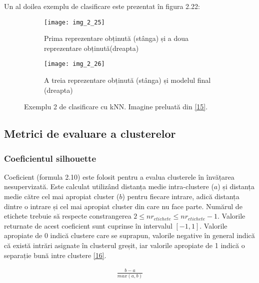 Un al doilea exemplu de clasificare este prezentat în figura 2.22:
\begin{figure}[!tbp]
  \begin{subfigure}[b]{0.4\textwidth}
    \texttt{[image: img\_2\_25]}
    \caption{Prima reprezentare obținută (stânga) și a doua reprezentare obținută(dreapta)}
    \label{fig:f1}
  \end{subfigure}
  \hfill
  \begin{subfigure}[b]{0.4\textwidth}
    \texttt{[image: img\_2\_26]}
    \caption{A treia reprezentare obținută (stânga) și modelul final (dreapta)}
    \label{fig:f2}
  \end{subfigure}
  \caption[Exemplu 2 de clasificare cu kNN]{Exemplu 2 de clasificare cu kNN. Imagine preluată din \hyperlink{gongdeguo}{[15]}.}
\end{figure}

\subsection{Metrici de evaluare a clusterelor}

\subsubsection{Coeficientul silhouette}
Coeficient (formula 2.10) este folosit pentru a evalua clusterele în învățarea nesupervizată. Este calculat utilizând distanța medie intra-clustere ($a$) și distanța medie către cel mai apropiat cluster ($b$) pentru fiecare intrare, adică distanța dintre o intrare și cel mai apropiat cluster din care nu face parte. Numărul de etichete trebuie să respecte constrangerea $2 \leq nr_{etichete} \leq nr_{etichete} - 1$. Valorile returnate de acest coeficient sunt cuprinse în intervalul $[-1, 1]$. Valorile apropiate de 0 indică clustere care se suprapun, valorile negative în general indică că există intrări asignate în clusterul greșit, iar valorile apropiate de 1 indică o separație bună intre clustere \hyperlink{silhouette}{[16]}.

\begin{align}
	\frac{b-a}{max(a,b)}
\end{align}
